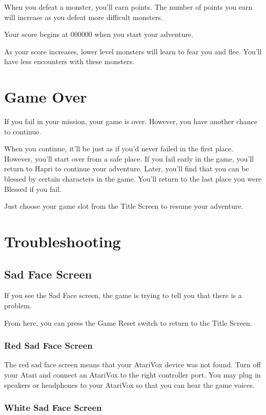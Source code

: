 \documentclass[10pt,twoside,openright]{memoir}
\begin{document}
When you  defeat a monster, you'll  earn points. The number  of points
you earn will increase as you defeat more difficult monsters.

Your score begins at 000000 when you start your adventure.

As your score  increases, lower level monsters will learn  to fear you
and flee. You'll have less encounters with these monsters.

\chapter{Game Over}

If you fail in your mission, your game is over. However, you have
another chance to continue.

When you continue, it'll be just as if you'd never failed in the first
place. However, you'll start over from a safe place. If you fail early
in the game, you'll return to Hapri to continue your adventure. Later,
you'll find that you can be blessed by certain characters in the
game. You'll return to the last place you were Blessed if you fail.

Just choose your game slot from the Title Screen to resume your
adventure.

\chapter{Troubleshooting}

\section{Sad Face Screen}

If you see the Sad Face screen, the game is trying to tell you that
there is a problem.

From here, you can press the Game Reset switch to return to the Title
Screen. 

\subsection{Red Sad Face Screen}

The red sad  face screen means that your AtariVox  device was not found. 
Turn off your Atari and connect an AtariVox to the right controller port. 
You may plug in speakers or headphones to your AtariVox so that you can hear
the game voices.

\subsection{White Sad Face Screen}
\end{document}
